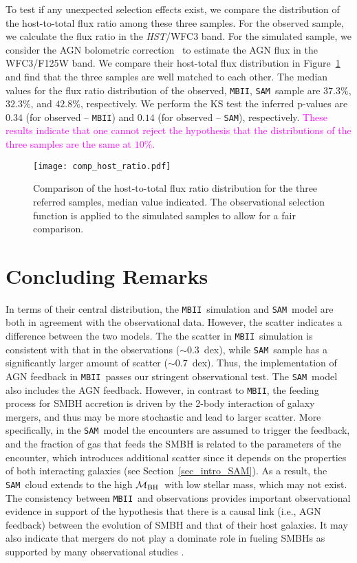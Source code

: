 \documentclass[twocolumn,trackchanges]{aastex63}
\newcommand{\hst}{{\it HST}}
\newcommand{\mbh}{$\mathcal M_{\rm BH}$}
\newcommand{\sam}{\texttt{SAM}}
\newcommand{\mbii}{\texttt{MBII}}
\newcommand{\pink}[1]{{ \textcolor{magenta}{#1}}}
\begin{document}
To test if any unexpected selection effects exist, we compare the distribution of the host-to-total flux ratio among these three samples. For the observed sample, we calculate the flux ratio in the \hst/WFC3 band. For the simulated sample, we consider the AGN bolometric correction~\citep{Elvis1994} to estimate the AGN flux in the WFC3/F125W band. We compare their host-total flux distribution in Figure~\ref{fig:comp_hist} and find that the three samples are well matched to each other. The median values for the flux ratio distribution of the observed, \mbii, \sam\ sample are $37.3\%$, $32.3\%$, and $42.8\%$, respectively. We perform the KS test the inferred p-values are $0.34$ (for observed -- \mbii) and $0.14$ (for observed -- \sam), respectively.\pink{These results indicate that one cannot reject the hypothesis that the distributions of the three samples are the same at $10\%$.}

\begin{figure}[t]
\texttt{[image: comp\_host\_ratio.pdf]}
\caption{Comparison of the host-to-total flux ratio distribution for the three referred samples, median value indicated. The observational selection function is applied to the simulated samples to allow for a fair comparison.
}
\label{fig:comp_hist}
\end{figure}

\section{Concluding Remarks}
\label{sec:conclusion}
In terms of their central distribution, the \mbii\ simulation and \sam\ model are both in agreement with the observational data. However, the scatter indicates a difference between the two models. The  the scatter in \mbii\ simulation is consistent with that in the observations ($\sim0.3$~dex), while \sam\ sample has a significantly larger amount of scatter ($\sim0.7$~dex). Thus, the implementation of AGN feedback in \mbii\ passes our stringent observational test. The \sam\ model also includes the AGN feedback. However, in contrast to \mbii, the feeding process for SMBH accretion is driven by the 2-body interaction of galaxy mergers, and thus may be more stochastic and lead to larger scatter. More specifically, in the \sam\ model the encounters are assumed to trigger the feedback, and the fraction of gas that feeds the SMBH is related to the parameters of the encounter, which introduces additional scatter since it depends on the properties of both interacting galaxies (see Section~\ref{sec_intro_SAM}). As a result, the \sam\ cloud extends to the high \mbh\ with low stellar mass, which may not exist. The consistency between \mbii\ and observations provides important observational evidence in support of the hypothesis that there is a causal link (i.e., AGN feedback) between the evolution of SMBH and that of their host galaxies. It may also indicate that mergers do not play a dominate role in fueling SMBHs as supported by many observational studies \citep{Ellison2011, Silverman2011,Mechtley2016,Goulding2018}.
\end{document}
